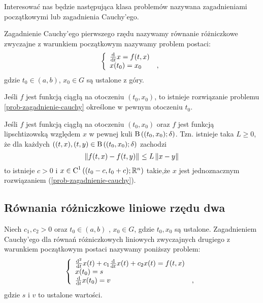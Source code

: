 \documentclass[12pt,a4paper]{report}
\begin{document}
Interesować nas będzie następująca klasa problemów nazywana zagadnieniami początkowymi lub zagadnienia Cauchy'ego.

\begin{problem} 
Zagadnienie Cauchy'ego pierwszego rzędu nazywamy równanie różniczkowe zwyczajne z warunkiem początkowym nazywamy problem postaci:
\begin{equation} \label{prob-zagadnienie-cauchy}
\left\{\begin{array}{ll}
\ddx{t} x = f(t,x) & \\
x(t_0) = x_0 &,
\end{array} \right.
\end{equation}
gdzie $t_0 \in (a,b)$, $x_0 \in G$ są ustalone z góry. 
\end{problem}

\begin{theorem}
Jeśli $f$ jest funkcją ciągłą na otoczeniu $(t_{0},x_{0})$, to istnieje rozwiązanie problemu \ref{prob-zagadnienie-cauchy} określone w pewnym otoczeniu $t_{0}$. 
\end{theorem}

\begin{theorem}
Jeśli $f$ jest funkcją ciągłą na otoczeniu $(t_{0},x_{0})$ oraz $f$ jest funkcją lipschtizowską względem $x$ w pewnej kuli $\ball{(t_0,x_0)}{\delta}$. Tzn.
 istnieje taka $L\geq 0$, że dla każdych $((t,x),(t,y) \in \ball{(t_0,x_0)}{\delta} $ zachodzi
$$
  \norm{f(t,x) - f(t,y)} \leq L \norm{ x-y} 
$$
 to istnieje $ c> 0 $ i $x \in \Ck{1}{(t_0-c,t_0+c); \setR^{n} }  $ takie,że $x$ jest jednoznacznym rozwiązaniem (\ref{prob-zagadnienie-cauchy}).
\end{theorem}
\subsection{Równania różniczkowe liniowe rzędu dwa }
\begin{problem}
Niech $c_1 , c_2 >0 $ oraz $t_0 \in (a,b) $ , $ x_0 \in G $, gdzie $t_0, x_0$ są ustalone.
Zagadnieniem Cauchy'ego dla równań różniczkowych liniowych zwyczajnych drugiego z warunkiem początkowym postaci nazywamy poniższy problem:
\begin{equation}
\left\{\begin{array}{ll}
\ddx [^2]{t} x(t) + c_1\ddx{t} x(t) + c_2x(t) = f(t,x) & \\
x(t_0) = s & \\
\ddx{t} x(t_0) = v &,
\end{array} \right.
\end{equation}
gdzie $ s$ i $v$ to ustalone wartości.
\end{problem}
\end{document}
